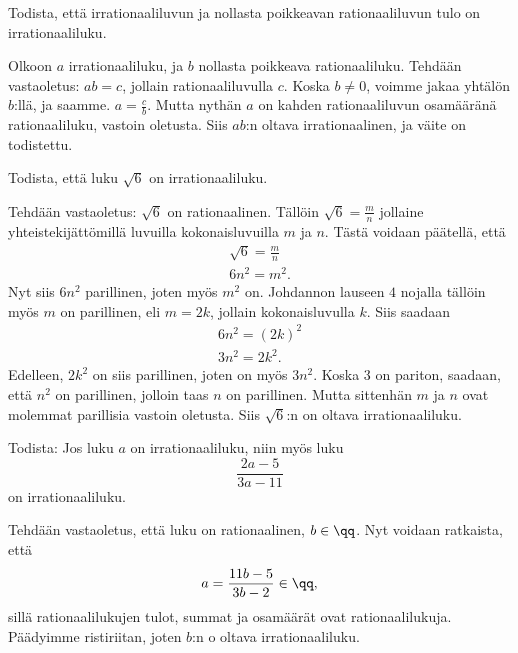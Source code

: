 \begin{tehtavasivu}
	\begin{tehtava}
		Todista, että irrationaaliluvun ja nollasta poikkeavan rationaaliluvun tulo on irrationaaliluku.
		\begin{vastaus}
			Olkoon $a$ irrationaaliluku, ja $b$ nollasta poikkeava rationaaliluku. Tehdään vastaoletus: $ab = c$, jollain rationaaliluvulla $c$. Koska $b \neq 0$, voimme jakaa yhtälön $b$:llä, ja saamme. $a = \frac{c}{b}$. Mutta nythän $a$ on kahden rationaaliluvun osamääränä rationaaliluku, vastoin oletusta. Siis $ab$:n oltava irrationaalinen, ja väite on todistettu.
		\end{vastaus}
	\end{tehtava}

	\begin{tehtava}
		Todista, että luku $\sqrt{6}$ on irrationaaliluku.
		\begin{vastaus}
			Tehdään vastaoletus: $\sqrt{6}$ on rationaalinen. Tällöin $\sqrt{6} = \frac{m}{n}$ jollaine yhteistekijättömillä luvuilla kokonaisluvuilla $m$ ja $n$. Tästä voidaan päätellä, että
			\begin{align*}
				\sqrt{6} = \frac{m}{n} \\
				6n^2 = m^2.
			\end{align*}
			Nyt siis $6n^2$ parillinen, joten myös $m^2$ on. Johdannon lauseen $4$ nojalla tällöin myös $m$ on parillinen, eli $m = 2k$, jollain kokonaisluvulla $k$. Siis saadaan
			 \begin{align*}
				6n^2 = (2k)^2 \\
				3n^2 = 2k^2.
			\end{align*}
			Edelleen, $2k^2$ on siis parillinen, joten on myös $3n^2$. Koska $3$ on pariton, saadaan, että $n^2$ on parillinen, jolloin taas $n$ on parillinen. Mutta sittenhän $m$ ja $n$ ovat molemmat parillisia vastoin oletusta. Siis $\sqrt{6}$:n on oltava irrationaaliluku.
		\end{vastaus}
	\end{tehtava}

	\begin{tehtava}
		Todista: Jos luku $a$ on irrationaaliluku, niin
		myös luku
		\[
			\frac{2a-5}{3a-11}
		\]
		on irrationaaliluku.
		\begin{vastaus}
			Tehdään vastaoletus, että luku on rationaalinen, $b \in \qq$. Nyt voidaan ratkaista, että
			\[
				a = \frac{11b - 5}{3b - 2} \in \qq,
			\]
			sillä rationaalilukujen tulot, summat ja osamäärät ovat rationaalilukuja. Päädyimme ristiriitan, joten $b$:n o oltava irrationaaliluku.
		\end{vastaus}
	\end{tehtava}


\end{tehtavasivu}
